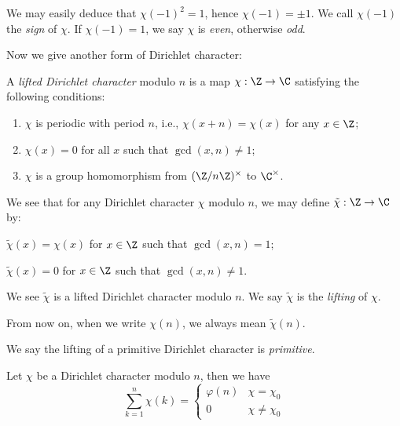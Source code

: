 \begin{remark}
    We may easily deduce that $\chi(-1)^2=1$, hence $\chi(-1)=\pm1$. We call $\chi(-1)$ the \emph{sign} of $\chi$. If $\chi(-1)=1$, we say $\chi$ is \emph{even}, otherwise \emph{odd}.
\end{remark}

Now we give another form of Dirichlet character:

\begin{definition}
    A \emph{lifted Dirichlet character} modulo $n$ is a map $\chi:\Z\rightarrow\C$ satisfying the following conditions:
    \begin{enumerate}
        \item $\chi$ is periodic with period $n$, i.e., $\chi(x+n)=\chi(x)$ for any $x\in\Z$;
        \item $\chi(x)=0$ for all $x$ such that $\gcd(x,n)\ne1$;
        \item $\chi$ is a group homomorphism from $(\Z/n\Z)^\times$ to $\C^\times$.
    \end{enumerate}
\end{definition}

\begin{remark}
    We see that for any Dirichlet character $\chi$ modulo $n$, we may define $\tilde\chi:\Z\rightarrow\C$ by:

    \begin{enumerate*}[itemjoin=\hspace*{4em}]
        \item $\tilde\chi(x)=\chi(x)$ for $x\in\Z$ such that $\gcd(x,n)=1$;
        \item $\tilde\chi(x)=0$ for $x\in\Z$ such that $\gcd(x,n)\ne1$.
    \end{enumerate*}

    \noindent We see $\tilde\chi$ is a lifted Dirichlet character modulo $n$. We say $\tilde\chi$ is the \emph{lifting} of $\chi$.
\end{remark}

\begin{notation}
    From now on, when we write $\chi(n)$, we always mean $\tilde\chi(n)$.
\end{notation}

\begin{definition}
    We say the lifting of a primitive Dirichlet character is \emph{primitive}.
\end{definition}

\begin{proposition}
    Let $\chi$ be a Dirichlet character modulo $n$, then we have $$ \sum_{k=1}^n{\chi(k)}=\begin{cases} \varphi(n) & \chi=\chi_0 \\ 0 & \chi\ne\chi_0 \end{cases} $$
\end{proposition}

